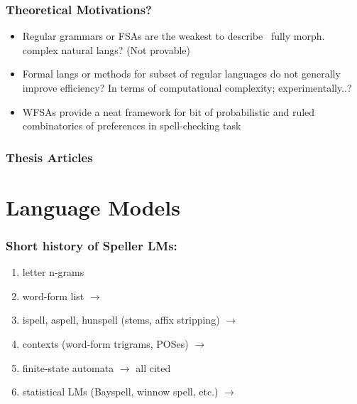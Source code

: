 \documentclass[t,12pt]{beamer}
\begin{document}
\begin{frame}
    \frametitle{Theoretical Motivations?}
    \begin{itemize}
        \item Regular grammars or FSAs are the weakest to describe ~fully
            morph. complex natural langs? (Not provable)
        \item Formal langs or methods for subset of regular languages do not
            generally improve efficiency? In terms of computational complexity;
            experimentally..?
        \item WFSAs provide a neat framework for bit of probabilistic and ruled
            combinatorics of preferences in spell-checking task
    \end{itemize}
\end{frame}


\begin{frame}[allowframebreaks]
  \frametitle{Thesis Articles}
  \begin{small}
      
      
    \end{small}
\end{frame}

\section{Language Models}

\begin{frame}
    \frametitle{Short history of Speller LMs:}
    \begin{enumerate}
        \item letter n-grams
        \item word-form list $\rightarrow$ \cite{pirinen2012effects}
        \item ispell, aspell, hunspell (stems, affix stripping)
            $\rightarrow$ \cite{pirinen2010building,pirinen2010creating}

        \item contexts (word-form trigrams, POSes) $\rightarrow$
            \cite{pirinen2012improving}
        \item finite-state automata $\rightarrow$ all cited
        \item statistical LMs (Bayspell, winnow spell, etc.)
            $\rightarrow$ \cite{pirinen2010finitestate}
    \end{enumerate}
\end{frame}
\end{document}
